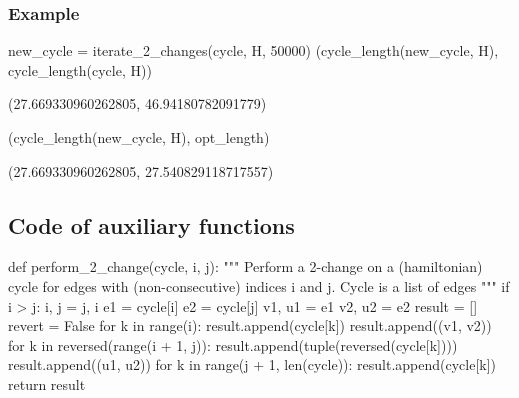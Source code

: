 \subsubsection*{Example}

\begin{sageCell}
    new_cycle = iterate_2_changes(cycle, H, 50000)
    (cycle_length(new_cycle, H), cycle_length(cycle, H))
\end{sageCell}
\begin{outCell}
    (27.669330960262805, 46.94180782091779)
\end{outCell}
\begin{sageCell}
    (cycle_length(new_cycle, H), opt_length)
\end{sageCell}
\begin{outCell}
    (27.669330960262805, 27.540829118717557)
\end{outCell}


\subsection{Code of auxiliary functions}

\begin{sageCell}
def perform_2_change(cycle, i, j):
    """
    Perform a 2-change on a (hamiltonian) cycle for edges with
    (non-consecutive) indices i and j. Cycle is a list of edges
    """
    if i > j:
        i, j = j, i
    e1 = cycle[i]
    e2 = cycle[j]
    v1, u1 = e1
    v2, u2 = e2
    result = []
    revert = False
    for k in range(i):
        result.append(cycle[k])
    result.append((v1, v2))
    for k in reversed(range(i + 1, j)):
        result.append(tuple(reversed(cycle[k])))
    result.append((u1, u2))
    for k in range(j + 1, len(cycle)):
        result.append(cycle[k])
    return result
\end{sageCell}

